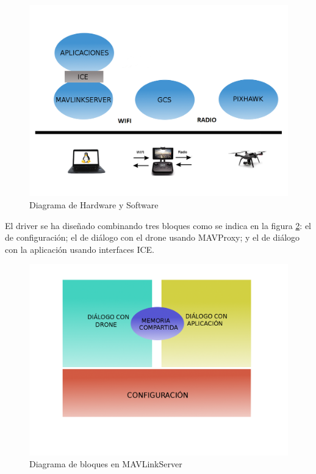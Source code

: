 \begin{figure}[H]
  \centering
  \includegraphics[scale=0.3]{imagenes/HWYSW.png}
  \caption{Diagrama de Hardware y Software}
  \label{fig:diagramaHwSw}
\end{figure}

El driver se ha diseñado combinando tres bloques como se indica en la figura \ref{fig:memoriaCompartida}: el de configuración; el de diálogo con el drone usando MAVProxy; y el de diálogo con la aplicación usando interfaces ICE.

\begin{figure}[H]
  \centering
  \includegraphics[scale=0.25]{imagenes/MEMORIACOMPARTIDA.png}
  \caption{Diagrama de bloques en MAVLinkServer}
  \label{fig:memoriaCompartida}
\end{figure}

